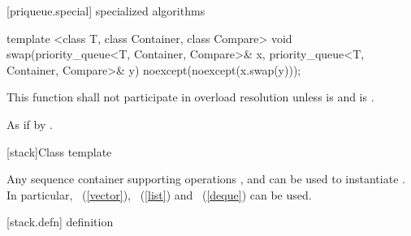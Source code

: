 [priqueue.special]{ specialized algorithms}

%
\begin{itemdecl}
template <class T, class Container, class Compare>
  void swap(priority_queue<T, Container, Compare>& x,
            priority_queue<T, Container, Compare>& y) noexcept(noexcept(x.swap(y)));
\end{itemdecl}

\begin{itemdescr}
\pnum
\remarks
This function shall not participate in overload resolution
unless  is  and
 is .

\pnum
\effects As if by .
\end{itemdescr}

[stack]{Class template }

\pnum
{}%
Any sequence container supporting operations
,
and
can be used to instantiate
.
In particular,
~(\ref{vector}),
~(\ref{list})
and
~(\ref{deque})
can be used.

[stack.defn]{ definition}

